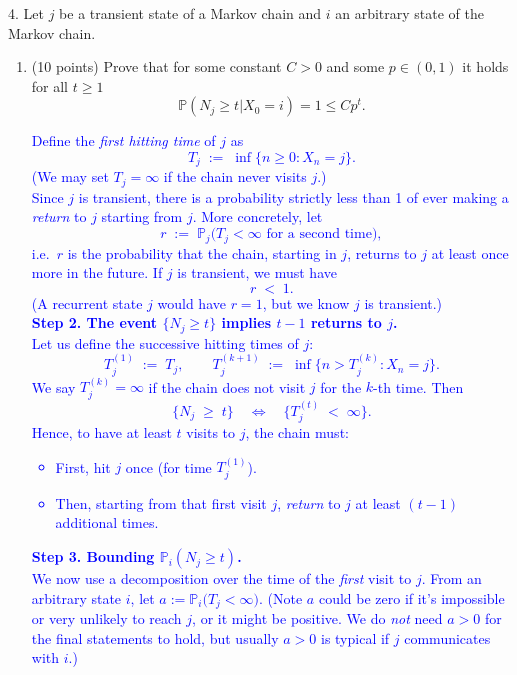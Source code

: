 \documentclass{article}
\begin{document}
\begin{enumerate}[label=(\alph*)]
\end{enumerate}

4. Let $j$ be a transient state of a Markov chain and $i$ an arbitrary state of the Markov chain.
 
\begin{enumerate}[label=(\alph*)]
    \item (10 points) Prove that for some constant $C > 0$ and some $p \in (0,1)$ it holds for all $t \geq 1$
\[
\mathbb{P}(N_j \geq t | X_0 = i) = 1 \leq C p^t.
\]

\textcolor{blue}{Define the \emph{first hitting time} of $j$ as
\[
T_j \;:=\; \inf\{n \ge 0 : X_n = j\}.
\]
(We may set $T_j = \infty$ if the chain never visits $j$.) \\
Since $j$ is transient, there is a probability strictly less than 1 of ever making a \textit{return} to $j$ starting from $j$. More concretely, let
\[
r \;:=\; \mathbb{P}_j\bigl(T_j < \infty\text{ for a second time}\bigr),
\]
i.e.\ $r$ is the probability that the chain, starting in $j$, returns to $j$ at least once more in the future. If $j$ is transient, we must have
\[
r \;<\; 1.
\]
(A recurrent state $j$ would have $r=1$, but we know $j$ is transient.)\\
\medskip
\noindent \textbf{Step 2. The event $\{N_j \ge t\}$ implies $t-1$ returns to $j$.} \\
Let us define the successive hitting times of $j$:
\[
T_j^{(1)} 
\;:=\; T_j,
\qquad
T_j^{(k+1)}
\;:=\; \inf\{ n > T_j^{(k)} : X_n = j \}.
\]
We say $T_j^{(k)} = \infty$ if the chain does not visit $j$ for the $k$-th time. Then
\[
\{N_j \;\ge\; t\}
\quad\Leftrightarrow\quad
\{ T_j^{(t)} \;<\;\infty \}.
\]
Hence, to have at least $t$ visits to $j$, the chain must:
\begin{itemize}
    \item First, hit $j$ once (for time $T_j^{(1)}$).
    \item Then, starting from that first visit $j$, \emph{return} to $j$ at least $(t-1)$ additional times.
\end{itemize}
\medskip
\noindent \textbf{Step 3. Bounding $\mathbb{P}_i(N_j \ge t)$.} \\
We now use a decomposition over the time of the \emph{first} visit to $j$. From an arbitrary state $i$, let $a := \mathbb{P}_i\bigl(T_j < \infty\bigr)$. (Note $a$ could be zero if it's impossible or very unlikely to reach $j$, or it might be positive. We do \emph{not} need $a>0$ for the final statements to hold, but usually $a>0$ is typical if $j$ communicates with $i$.) \\
}
\end{enumerate}
\end{document}

